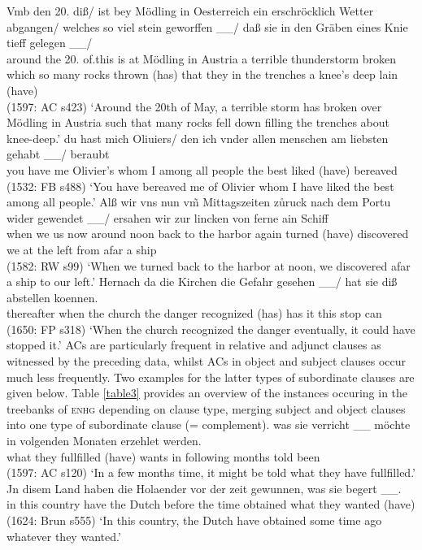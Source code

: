 \documentclass[output=paper,colorlinks,citecolor=brown]{langscibook}
\begin{document}
\eal
\ex  \label{postfield}
\gll Vmb den 20. diß/ ist bey Mödling in Oesterreich ein erschröcklich Wetter abgangen/ welches so viel stein geworffen \_\_/ daß sie in den Gräben eines Knie tieff gelegen \_\_/  \\ around the 20. of.this is at Mödling in Austria a terrible thunderstorm broken which so many rocks thrown (has) that they in the trenches a knee's deep lain (have)   \\ \hfill (1597: AC s423)
\glt `Around the 20th of May, a terrible storm has broken over Mödling in Austria such that many rocks fell down filling the trenches about knee-deep.'
\ex \label{middlefield}
\gll du hast mich Oliuiers/ den ich vnder allen menschen am liebsten gehabt \_\_/ beraubt \\ you have me Olivier's whom I among all people the best liked (have) bereaved \\ \hfill (1532: FB s488) 
\glt `You have bereaved me of Olivier whom I have liked the best among all people.'
\zl
\eal \label{prefield}
\ex 
\gll Alß wir vns nun v\~{m} Mittagszeiten z\r{u}ruck nach dem Portu wider gewendet \_\_/ ersahen wir zur lincken von ferne ain Schiff \\ when we us now around noon back to the harbor again turned (have) discovered we {at the} left from afar a ship \\ \hfill (1582: RW s99)
\glt `When we turned back to the harbor at noon, we discovered afar a ship to our left.'
\ex \label{prefield_adja}
\gll Hernach da die Kirchen die Gefahr gesehen \_\_/ hat sie diß abstellen koennen. \\ thereafter when the church the danger recognized (has) has it this stop can  \\ \hfill (1650: FP s318)
\glt `When the church recognized the danger eventually, it could have stopped it.'
\zl
ACs are particularly frequent in relative and adjunct clauses as witnessed by the preceding data, whilst ACs in object and subject clauses occur much less frequently. Two examples for the latter types of subordinate clauses are given below. Table \ref{table3} provides an overview of the instances occuring in the treebanks of \textsc{enhg} depending on clause type, merging subject and object clauses into one type of subordinate clause (= complement).
\eal
\ex
\gll was sie verricht \_\_ möchte in volgenden Monaten erzehlet werden. \\ what they fullfilled (have) wants in following months told been \\  \hfill (1597: AC s120)
\glt `In a few months time, it might be told what they have fullfilled.'
\ex
\gll Jn disem Land haben die Holaender vor der zeit gewunnen, was sie begert \_\_. \\ in this country have the Dutch before the time obtained what they wanted (have)  \\ \hfill (1624: Brun s555)
\glt `In this country, the Dutch have obtained some time ago whatever they wanted.'
\zl
\end{document}

